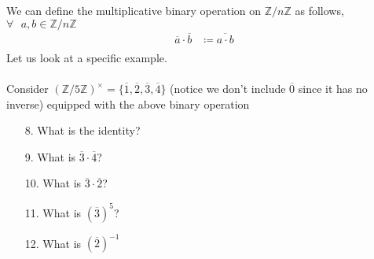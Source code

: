 \documentclass{article}
\begin{document}
We can define the multiplicative binary operation on $\mathbb{Z}/n\mathbb{Z}$ as follows, $\forall\text{ }a,b\in\mathbb{Z}/n\mathbb{Z}$
\begin{align*}
  \overline{a} \cdot \overline{b} &\coloneq \overline{a\cdot b}\\
\end{align*}
  Let us look at a specific example.
  \\\\Consider $(\mathbb{Z}/5\mathbb{Z})^\times = \{\overline{1}, \overline{2}, \overline{3}, \overline{4}\}$ (notice we don't include $\overline{0}$ since it has no inverse) equipped with the above binary operation
  \begin{itemize}
  \item [8.] What is the identity?
  \item [9.] What is $\overline{3} \cdot \overline{4}$?
  \item [10.] What is $\overline{3} \cdot \overline{2}$?
  \item [11.] What is $(\overline{3})^5$?
  \item [12.] What is $(\overline{2})^{-1}$
  \end{itemize}

  
\end{document}
